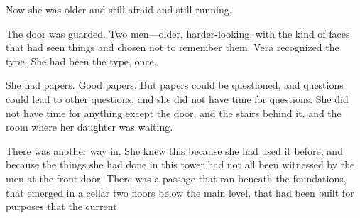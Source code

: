 \documentclass[12pt,letterpaper,openany]{book}
\begin{document}
\par
Now she was older and still afraid and still running.
\par
The door was guarded. Two men—older, harder-looking, with the kind of faces that had seen things and chosen not to remember them. Vera recognized the type. She had been the type, once.
\par
She had papers. Good papers. But papers could be questioned, and questions could lead to other questions, and she did not have time for questions. She did not have time for anything except the door, and the stairs behind it, and the room where her daughter was waiting.
\par
There was another way in. She knew this because she had used it before, and because the things she had done in this tower had not all been witnessed by the men at the front door. There was a passage that ran beneath the foundations, that emerged in a cellar two floors below the main level, that had been built for purposes that the current
\par
\end{document}
